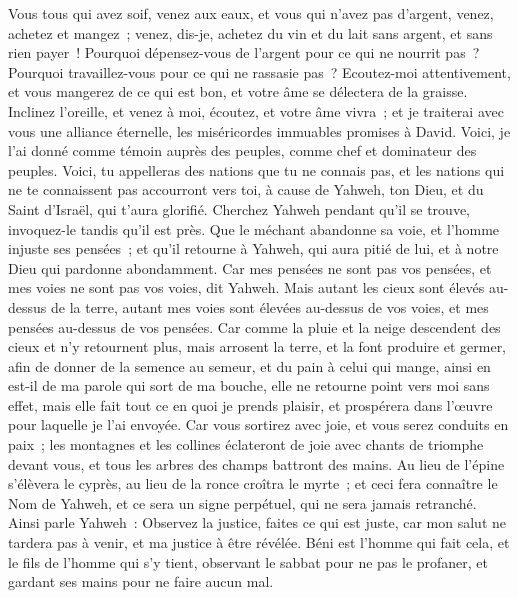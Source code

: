 \begin{multicols}{2}
\VerseOne{}Vous tous qui avez soif, venez aux eaux, et vous qui n'avez pas d'argent, venez, achetez et mangez~; venez, dis-je, achetez du vin et du lait sans argent, et sans rien payer~!
Pourquoi dépensez-vous de l'argent pour ce qui ne nourrit pas~? Pourquoi travaillez-vous pour ce qui ne rassasie pas~? Ecoutez-moi attentivement, et vous mangerez de ce qui est bon, et votre âme se délectera de la graisse.
Inclinez l'oreille, et venez à moi, écoutez, et votre âme vivra~; et je traiterai avec vous une alliance éternelle, les miséricordes immuables promises à David.
Voici, je l'ai donné comme témoin auprès des peuples, comme chef et dominateur des peuples.
Voici, tu appelleras des nations que tu ne connais pas, et les nations qui ne te connaissent pas accourront vers toi, à cause de Yahweh, ton Dieu, et du Saint d'Israël, qui t'aura glorifié.
Cherchez Yahweh pendant qu'il se trouve, invoquez-le tandis qu'il est près.
Que le méchant abandonne sa voie, et l'homme injuste ses pensées~; et qu'il retourne à Yahweh, qui aura pitié de lui, et à notre Dieu qui pardonne abondamment.
Car mes pensées ne sont pas vos pensées, et mes voies ne sont pas vos voies, dit Yahweh.
Mais autant les cieux sont élevés au-dessus de la terre, autant mes voies sont élevées au-dessus de vos voies, et mes pensées au-dessus de vos pensées.
Car comme la pluie et la neige descendent des cieux et n'y retournent plus, mais arrosent la terre, et la font produire et germer, afin de donner de la semence au semeur, et du pain à celui qui mange,
ainsi en est-il de ma parole qui sort de ma bouche, elle ne retourne point vers moi sans effet, mais elle fait tout ce en quoi je prends plaisir, et prospérera dans l'œuvre pour laquelle je l'ai envoyée.
Car vous sortirez avec joie, et vous serez conduits en paix~; les montagnes et les collines éclateront de joie avec chants de triomphe devant vous, et tous les arbres des champs battront des mains.
Au lieu de l'épine s'élèvera le cyprès, au lieu de la ronce croîtra le myrte~; et ceci fera connaître le Nom de Yahweh, et ce sera un signe perpétuel, qui ne sera jamais retranché.
\VerseOne{}Ainsi parle Yahweh~: Observez la justice, faites ce qui est juste, car mon salut ne tardera pas à venir, et ma justice à être révélée.
Béni est l'homme qui fait cela, et le fils de l'homme qui s'y tient, observant le sabbat pour ne pas le profaner, et gardant ses mains pour ne faire aucun mal.

\end{multicols}
